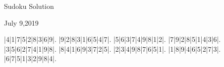 \documentclass{article}
\begin{document}
\begin{center}
\Huge{Sudoku Solution}
\end{center}
\begin{center}
\Large{July 9,2019}
\end{center}
\begin{sudoku}
|4|1|7|5|2|8|3|6|9|.
|9|2|8|3|1|6|5|4|7|.
|5|6|3|7|4|9|8|1|2|.
|7|9|2|8|5|1|4|3|6|.
|3|5|6|2|7|4|1|9|8|.
|8|4|1|6|9|3|7|2|5|.
|2|3|4|9|8|7|6|5|1|.
|1|8|9|4|6|5|2|7|3|.
|6|7|5|1|3|2|9|8|4|.
\end{sudoku}
\end{document}
